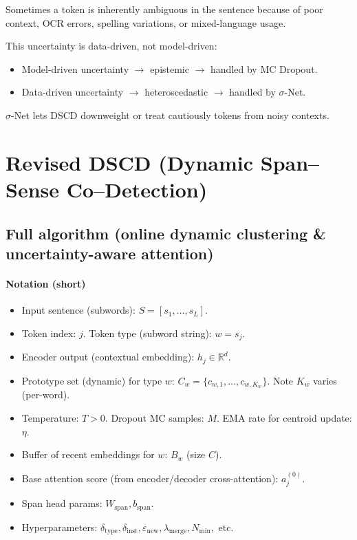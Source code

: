 \documentclass[a4paper,12pt]{article}
\begin{document}
Sometimes a token is inherently ambiguous in the sentence because of poor context, OCR errors, spelling variations, or mixed-language usage.

This uncertainty is data-driven, not model-driven:
\begin{itemize}
    \item Model-driven uncertainty $\rightarrow$ epistemic $\rightarrow$ handled by MC Dropout.
    \item Data-driven uncertainty $\rightarrow$ heteroscedastic $\rightarrow$ handled by $\sigma$-Net.
\end{itemize}

$\sigma$-Net lets DSCD downweight or treat cautiously tokens from noisy contexts.

\bigskip

\section*{Revised DSCD (Dynamic Span–Sense Co–Detection)}

\subsection*{Full algorithm (online dynamic clustering \& uncertainty-aware attention)}

\paragraph{Notation (short)}
\begin{itemize}
    \item Input sentence (subwords): $S = [s_1, \ldots, s_L]$.
    \item Token index: $j$. Token type (subword string): $w = s_j$.
    \item Encoder output (contextual embedding): $h_j \in \mathbb{R}^d$.
    \item Prototype set (dynamic) for type $w$: $C_w = \{c_{w,1}, \ldots, c_{w,K_w}\}$. Note $K_w$ varies (per-word).
    \item Temperature: $T > 0$. Dropout MC samples: $M$. EMA rate for centroid update: $\eta$.
    \item Buffer of recent embeddings for $w$: $B_w$ (size $C$).
    \item Base attention score (from encoder/decoder cross-attention): $a^{(0)}_j$.
    \item Span head params: $W_{\text{span}}, b_{\text{span}}$.
    \item Hyperparameters: $\delta_{\text{type}}, \delta_{\text{inst}}, \varepsilon_{\text{new}}, \lambda_{\text{merge}}, N_{\min},$ etc.
\end{itemize}
\end{document}
